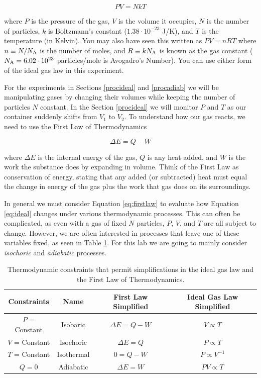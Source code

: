 \begin{equation}
\label{eq:ideal}
PV=NkT
\end{equation}

\noindent where $P$ is the pressure of the gas, $V$ is the volume it occupies, $N$ is the number of particles, $k$ is Boltzmann's constant ($1.38 \cdot 10^{-23}$ J/K), and $T$ is the temperature (in Kelvin).  You may also have seen this written as $PV=nRT$ where $n \equiv N/N_{\rm A}$ is the number of moles, and $R \equiv kN_{\rm A}$ is known as the gas constant ($N_{\rm A} = 6.02 \cdot 10^{23}$ particles/mole is Avogadro's Number).  You can use either form of the ideal gas law in this experiment.\myskip

For the experiments in Sections \ref{procideal} and \ref{procadiab} we will be manipulating gases by changing their volumes while keeping the number of particles $N$ constant.  In the Section \ref{procideal} we will monitor $P$ and $T$ as our container suddenly shifts from $V_{1}$ to $V_{2}$.  To understand how our gas reacts, we need to use the First Law of Thermodynamics

\begin{equation}
\label{eq:firstlaw}
\Delta E = Q - W
\end{equation}

\noindent where  $\Delta E$ is the internal energy of the gas, $Q$ is any heat added, and $W$ is the work the substance does by expanding in volume.  Think of the First Law as conservation of energy, stating that any added (or subtracted) heat must equal the change in energy of the gas plus the work that gas does on its surroundings.\myskip

In general we must consider Equation \ref{eq:firstlaw} to evaluate how Equation \ref{eq:ideal} changes under various thermodynamic processes.  This can often be complicated, as even with a gas of fixed $N$ particles, $P$, $V$, and $T$ are all subject to change.  However, we are often interested in processes that leave one of these variables fixed, as seen in Table \ref{processes}.  For this lab we are going to mainly consider \textit{isochoric} and \textit{adiabatic} processes.\myskip

\begin{table}
\begin{center}
\begin{tabular}{| c | c | c | c |}
\hline
	Constraints & Name & First Law Simplified & Ideal Gas Law Simplified \\
	\hline
	$P$ = Constant & Isobaric & $\Delta E = Q - W$ & $V \propto T$ \\
	$V$ = Constant & Isochoric & $\Delta E = Q$ & $P \propto T$ \\
	$T$ = Constant & Isothermal & $0 = Q - W$ & $P \propto V^{-1}$ \\
	$Q = 0$ & Adiabatic & $\Delta E = W$ & $PV \propto T$ \\
	\hline
\end{tabular}
\end{center}
\caption{Thermodynamic constraints that permit simplifications in the ideal gas law and the First Law of Thermodynamics.}
\label{processes}
\end{table}


